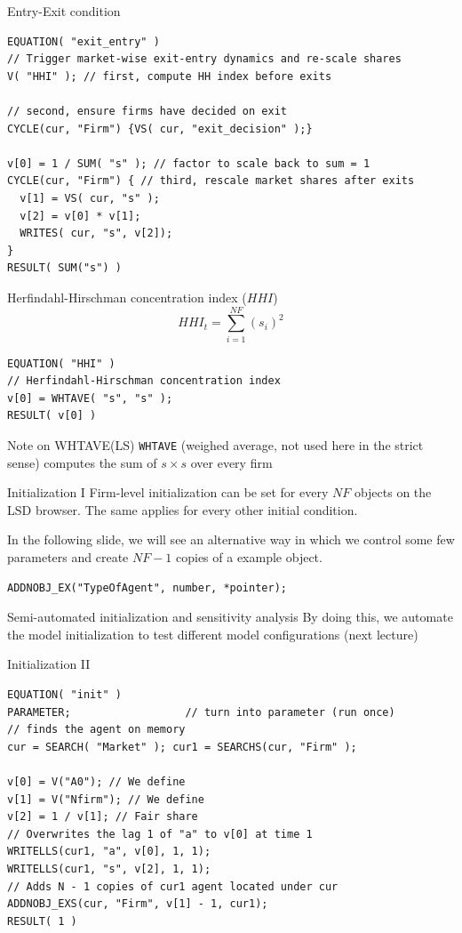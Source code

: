 \documentclass[bigger,aspectratio=169]{beamer}
\begin{document}
\begin{frame}[label={sec:org9463746},fragile]{Entry-Exit condition}
 \begin{verbatim}
EQUATION( "exit_entry" )
// Trigger market-wise exit-entry dynamics and re-scale shares
V( "HHI" ); // first, compute HH index before exits

// second, ensure firms have decided on exit
CYCLE(cur, "Firm") {VS( cur, "exit_decision" );}

v[0] = 1 / SUM( "s" ); // factor to scale back to sum = 1
CYCLE(cur, "Firm") { // third, rescale market shares after exits
  v[1] = VS( cur, "s" );
  v[2] = v[0] * v[1];
  WRITES( cur, "s", v[2]);
}
RESULT( SUM("s") )
\end{verbatim}
\end{frame}
\begin{frame}[label={sec:orgcf60d8c},fragile]{Herfindahl-Hirschman concentration index (\(HHI\))}
 \begin{equation}
HHI_{t} = \sum_{i=1}^{NF} (s_{i})^2
\end{equation}


\begin{verbatim}
EQUATION( "HHI" )
// Herfindahl-Hirschman concentration index
v[0] = WHTAVE( "s", "s" );
RESULT( v[0] )
\end{verbatim}
\begin{block}{Note on WHTAVE(LS)}
\texttt{WHTAVE} (weighed average, not used here in the strict sense) computes the sum of \(s\times s\) over every firm
\end{block}
\end{frame}
\begin{frame}[label={sec:org39ce6a5},fragile]{Initialization I}
 Firm-level initialization can be set for every \(NF\) objects on the LSD browser.
The same applies for every other initial condition.

In the following slide, we will see an alternative way in which we control some few parameters and create \(NF-1\) copies of a example object.

\begin{verbatim}
ADDNOBJ_EX("TypeOfAgent", number, *pointer);
\end{verbatim}
\begin{block}{Semi-automated initialization and sensitivity analysis}
By doing this, we automate the model initialization to test different model configurations (next lecture)
\end{block}
\end{frame}
\begin{frame}[label={sec:org5014c5f},fragile]{Initialization II}
 \begin{verbatim}
EQUATION( "init" )
PARAMETER;                  // turn into parameter (run once)
// finds the agent on memory
cur = SEARCH( "Market" ); cur1 = SEARCHS(cur, "Firm" );

v[0] = V("A0"); // We define
v[1] = V("Nfirm"); // We define
v[2] = 1 / v[1]; // Fair share
// Overwrites the lag 1 of "a" to v[0] at time 1
WRITELLS(cur1, "a", v[0], 1, 1);
WRITELLS(cur1, "s", v[2], 1, 1);
// Adds N - 1 copies of cur1 agent located under cur
ADDNOBJ_EXS(cur, "Firm", v[1] - 1, cur1);
RESULT( 1 )
\end{verbatim}
\end{frame}
\end{document}
